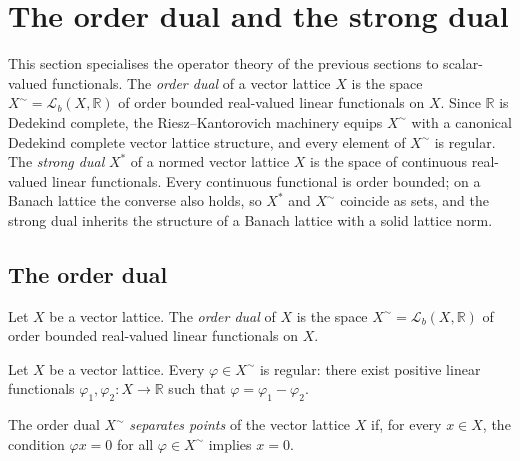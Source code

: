 \section{The order dual and the strong dual}

This section specialises the operator theory of the previous
sections to scalar-valued functionals. The \emph{order dual} of a
vector lattice $X$ is the space $X^{\sim} = \mathcal{L}_b(X,
\mathbb{R})$ of order bounded real-valued linear functionals on
$X$. Since $\mathbb{R}$ is Dedekind complete, the
Riesz--Kantorovich machinery equips $X^{\sim}$ with a canonical
Dedekind complete vector lattice structure, and every element of
$X^{\sim}$ is regular. The \emph{strong dual} $X^{*}$ of a normed
vector lattice $X$ is the space of continuous real-valued linear
functionals. Every continuous functional is order bounded; on a
Banach lattice the converse also holds, so $X^{*}$ and $X^{\sim}$
coincide as sets, and the strong dual inherits the structure of a
Banach lattice with a solid lattice norm.

\subsection{The order dual}

\begin{definition}
\label{def:orderDualSpace}
\leanok
{}
Let $X$ be a vector lattice. The \emph{order dual} of $X$ is the
space $X^{\sim} = \mathcal{L}_b(X, \mathbb{R})$ of order bounded
real-valued linear functionals on $X$.
\end{definition}

\begin{lemma}
\label{lem:orderDualSpace-isRegularOp}
\leanok
{}
Let $X$ be a vector lattice. Every $\varphi \in X^{\sim}$ is
regular: there exist positive linear functionals $\varphi_1,
\varphi_2 \colon X \to \mathbb{R}$ such that $\varphi =
\varphi_1 - \varphi_2$.
\end{lemma}

\begin{definition}
\label{def:orderDualSpace-separatesPoints}
\leanok
{}
The order dual $X^{\sim}$ \emph{separates points} of the vector
lattice $X$ if, for every $x \in X$, the condition $\varphi x = 0$
for all $\varphi \in X^{\sim}$ implies $x = 0$.
\end{definition}

